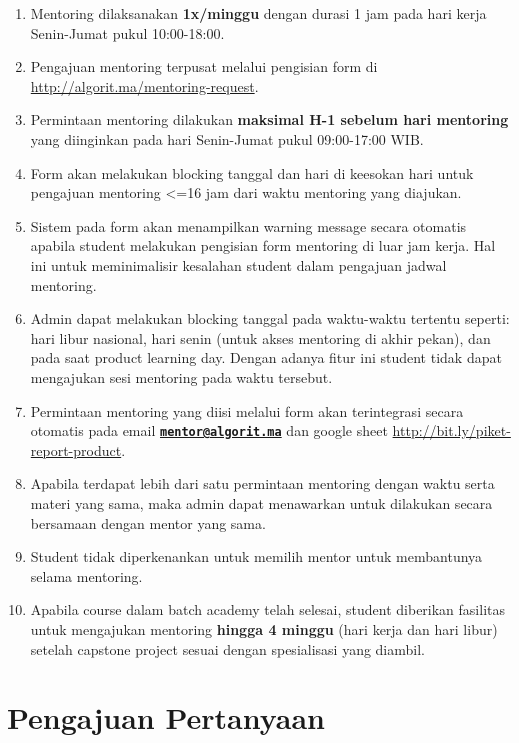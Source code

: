 \documentclass[
]{book}
\providecommand{\tightlist}{%
  \setlength{\itemsep}{0pt}\setlength{\parskip}{0pt}}
\begin{document}
\begin{enumerate}
\def\labelenumi{\arabic{enumi}.}
\tightlist
\item
  Mentoring dilaksanakan \textbf{1x/minggu} dengan durasi 1 jam pada hari kerja Senin-Jumat pukul 10:00-18:00.
\item
  Pengajuan mentoring terpusat melalui pengisian form di \url{http://algorit.ma/mentoring-request}.
\item
  Permintaan mentoring dilakukan \textbf{maksimal H-1 sebelum hari mentoring} yang diinginkan pada hari Senin-Jumat pukul 09:00-17:00 WIB.
\item
  Form akan melakukan blocking tanggal dan hari di keesokan hari untuk pengajuan mentoring \textless=16 jam dari waktu mentoring yang diajukan.
\item
  Sistem pada form akan menampilkan warning message secara otomatis apabila student melakukan pengisian form mentoring di luar jam kerja. Hal ini untuk meminimalisir kesalahan student dalam pengajuan jadwal mentoring.
\item
  Admin dapat melakukan blocking tanggal pada waktu-waktu tertentu seperti: hari libur nasional, hari senin (untuk akses mentoring di akhir pekan), dan pada saat product learning day. Dengan adanya fitur ini student tidak dapat mengajukan sesi mentoring pada waktu tersebut.
\item
  Permintaan mentoring yang diisi melalui form akan terintegrasi secara otomatis pada email \textbf{\href{mailto:mentor@algorit.ma}{\nolinkurl{mentor@algorit.ma}}} dan google sheet \url{http://bit.ly/piket-report-product}.
\item
  Apabila terdapat lebih dari satu permintaan mentoring dengan waktu serta materi yang sama, maka admin dapat menawarkan untuk dilakukan secara bersamaan dengan mentor yang sama.
\item
  Student tidak diperkenankan untuk memilih mentor untuk membantunya selama mentoring.
\item
  Apabila course dalam batch academy telah selesai, student diberikan fasilitas untuk mengajukan mentoring \textbf{hingga 4 minggu} (hari kerja dan hari libur) setelah capstone project sesuai dengan spesialisasi yang diambil.
\end{enumerate}

\hypertarget{pengajuan-pertanyaan}{%
\section{Pengajuan Pertanyaan}\label{pengajuan-pertanyaan}}
\end{document}

